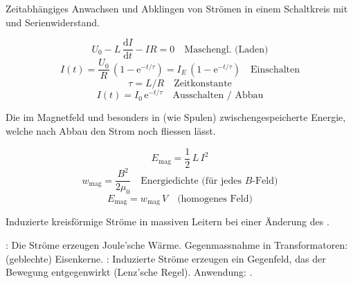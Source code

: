 \begin{runintext}
Zeitabhängiges Anwachsen und Abklingen von Strömen in einem Schaltkreis mit  und Serienwiderstand.
\end{runintext}
\begin{formulabox}
\[ U_0 - L\,\frac{\mathrm{d}I}{\mathrm{d}t} - I R = 0 \quad \text{Maschengl.\ (Laden)} \]
\formulasep
\[ I(t) = \frac{U_0}{R}\,(1 - \mathrm{e}^{-t/\tau}) = I_E\,(1 - \mathrm{e}^{-t/\tau}) \quad \text{Einschalten} \]
\[ \tau = L/R \quad \text{Zeitkonstante} \]
\formulasep
\[ I(t) = I_0\,\mathrm{e}^{-t/\tau} \quad \text{Ausschalten / Abbau} \]
\end{formulabox}

\begin{runintext}
Die im Magnetfeld und besonders in  (wie Spulen) zwischengespeicherte Energie, welche nach Abbau den Strom noch fliessen lässt.
\end{runintext}
\begin{formulabox}
\[ E_{\mathrm{mag}} = \frac{1}{2}\,L\,I^2 \]
\formulasep
\[ w_{\mathrm{mag}} = \frac{B^2}{2\mu_0} \quad \text{Energiedichte (für jedes $B$-Feld)} \]
\[ E_{\mathrm{mag}} = w_{\mathrm{mag}}\,V \quad \text{(homogenes Feld)} \]
\end{formulabox}

\begin{runintext}
Induzierte kreisförmige Ströme in massiven Leitern bei einer Änderung des .
\end{runintext}
\begin{statementbox}
: Die Ströme erzeugen Joule'sche Wärme. Gegenmassnahme in Transformatoren:  (geblechte) Eisenkerne. \ZSFgapXS
{}: Induzierte Ströme erzeugen ein Gegenfeld, das der Bewegung entgegenwirkt (Lenz'sche Regel). Anwendung: .
\end{statementbox}

